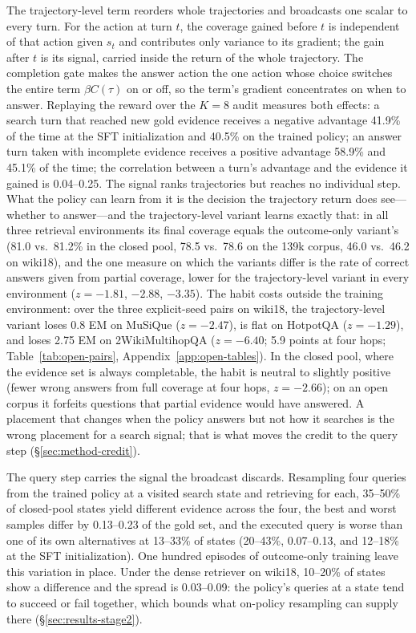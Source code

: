The trajectory-level term reorders whole trajectories and broadcasts
one scalar to every turn. For the action at turn $t$, the coverage
gained before $t$ is independent of that action given $s_t$ and
contributes only variance to its gradient; the gain after $t$ is its
signal, carried inside the return of the whole trajectory. The
completion gate makes the answer action the one action whose choice
switches the entire term $\beta C(\tau)$ on or off, so the term's
gradient concentrates on when to answer. Replaying the reward over the
$K{=}8$ audit measures both effects: a search turn that reached new
gold evidence receives a negative
advantage 41.9\% of the time at the SFT initialization and 40.5\% on
the trained policy; an answer turn taken with incomplete evidence
receives a positive advantage 58.9\% and 45.1\% of the time; the
correlation between a turn's advantage and the evidence it gained is
0.04--0.25. The signal ranks trajectories but reaches no individual
step. What the policy can learn from it is the decision the trajectory
return does see---whether to answer---and the trajectory-level variant
learns exactly that: in all three retrieval environments its final
coverage equals the outcome-only variant's (81.0 vs.\ 81.2\% in the closed
pool, 78.5 vs.\ 78.6 on the 139k corpus, 46.0 vs.\ 46.2 on wiki18),
and the one measure on which the variants differ is the rate of correct
answers given from partial coverage, lower for the trajectory-level
variant in every environment ($z=-1.81$, $-2.88$, $-3.35$). The habit
costs outside the training environment: over the three explicit-seed
pairs on wiki18, the trajectory-level variant loses 0.8 EM on MuSiQue
($z=-2.47$), is flat on HotpotQA ($z=-1.29$), and loses 2.75 EM on
2WikiMultihopQA ($z=-6.40$; 5.9 points at four hops;
Table~\ref{tab:open-pairs}, Appendix~\ref{app:open-tables}). In the
closed pool, where the evidence set is always completable, the habit
is neutral to slightly positive (fewer wrong answers from full coverage
at four hops, $z=-2.66$); on an open corpus it forfeits questions that
partial evidence would have answered. A placement that changes when the
policy answers but not how it searches is the wrong placement for a
search signal; that is what moves the credit to the query step
(\S\ref{sec:method-credit}).

The query step carries the signal the broadcast discards. Resampling
four queries from the trained policy at a visited search state and
retrieving for each, 35--50\% of closed-pool states yield different
evidence across the four, the best and worst samples differ by
0.13--0.23 of the gold set, and the executed query is worse than one of
its own alternatives at 13--33\% of states (20--43\%, 0.07--0.13, and
12--18\% at the SFT initialization). One hundred episodes of
outcome-only training leave this variation in place. Under the dense
retriever on wiki18, 10--20\% of states show a difference and the
spread is 0.03--0.09: the policy's queries at a state tend to succeed or
fail together, which bounds what on-policy resampling can supply
there (\S\ref{sec:results-stage2}).

